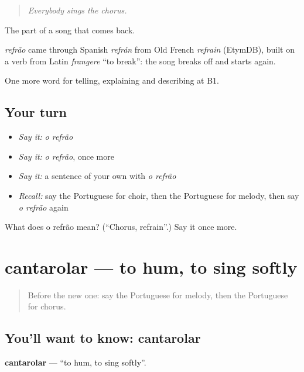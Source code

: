 \begin{quote}
\emph{Everybody sings the chorus.}
\end{quote}

The part of a song that comes back.

\begin{cousinweb}
\emph{refrão} came through Spanish \emph{refrán} from Old French \emph{refrain} (EtymDB), built on a verb from Latin \emph{frangere} \textquotedblleft{}to break\textquotedblright{}: the song breaks off and starts again.
\end{cousinweb}

\begin{grammarlens}[title={What you've built}]
One more word for telling, explaining and describing at B1.
\end{grammarlens}

\subsection*{Your turn}
\begin{itemize}
\raggedright
  \item \emph{Say it:} \emph{o refrão}
  \item \emph{Say it:} \emph{o refrão}, once more
  \item \emph{Say it:} a sentence of your own with \emph{o refrão}
  \item \emph{Recall:} say the Portuguese for choir, then the Portuguese for melody, then say \emph{o refrão} again
\end{itemize}

\begin{tcolorbox}[breakable,colback=teal!4,colframe=teal!35!black,title={Before you move on}]
What does o refrão mean? (\textquotedblleft{}Chorus, refrain\textquotedblright{}.) Say it once more.
\end{tcolorbox}
\section[cantarolar]{cantarolar — to hum, to sing softly}

\label{lesson:PT-C518-cantarolar}



\begin{quote}
Before the new one: say the Portuguese for melody, then the Portuguese for chorus.
\end{quote}

\subsection*{You'll want to know: cantarolar}
\textbf{cantarolar} — \textquotedblleft{}to hum, to sing softly\textquotedblright{}.

